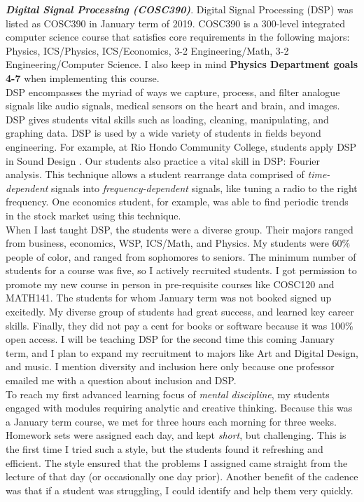 \documentclass[../../../main.tex]{subfiles}
\begin{document}
\textbf{\textit{Digital Signal Processing (COSC390)}}.  Digital Signal Processing (DSP) was listed as COSC390 in January term of 2019.  COSC390 is a 300-level integrated computer science course that satisfies core requirements in the following majors: Physics, ICS/Physics, ICS/Economics, 3-2 Engineering/Math, 3-2 Engineering/Computer Science.  I also keep in mind \textbf{Physics Department goals 4-7} when implementing this course.
\\
\vspace{0.25cm}
DSP encompasses the myriad of ways we capture, process, and filter analogue signals like audio signals, medical sensors on the heart and brain, and images.  DSP gives students vital skills such as loading, cleaning, manipulating, and graphing data.  DSP is used by a wide variety of students in fields beyond engineering.  For example, at Rio Hondo Community College, students apply DSP in Sound Design \cite{rio_hondo}.  Our students also practice a vital skill in DSP: Fourier analysis.  This technique allows a student rearrange data comprised of \textit{time-dependent} signals into \textit{frequency-dependent} signals, like tuning a radio to the right frequency.  One economics student, for example, was able to find periodic trends in the stock market using this technique.
\\
\vspace{0.25cm}
When I last taught DSP, the students were a diverse group.  Their majors ranged from business, economics, WSP, ICS/Math, and Physics.  My students were 60\% people of color, and ranged from sophomores to seniors.  The minimum number of students for a course was five, so I actively recruited students.  I got permission to promote my new course in person in pre-requisite courses like COSC120 and MATH141.  The students for whom January term was not booked signed up excitedly.  My diverse group of students had great success, and learned key career skills.  Finally, they did not pay a cent for books or software because it was 100\% open access.  I will be teaching DSP for the second time this coming January term, and I plan to expand my recruitment to majors like Art and Digital Design, and music.  I mention diversity and inclusion here only because one professor emailed me with a question about inclusion and DSP. 
\\
\vspace{0.25cm}
To reach my first advanced learning focus of \textit{mental discipline}, my students engaged with modules requiring analytic and creative thinking.  Because this was a January term course, we met for three hours each morning for three weeks.  Homework sets were assigned each day, and kept \textit{short}, but challenging.  This is the first time I tried such a style, but the students found it refreshing and efficient.  The style ensured that the problems I assigned came straight from the lecture of that day (or occasionally one day prior).  Another benefit of the cadence was that if a student was struggling, I could identify and help them very quickly.
\end{document}
